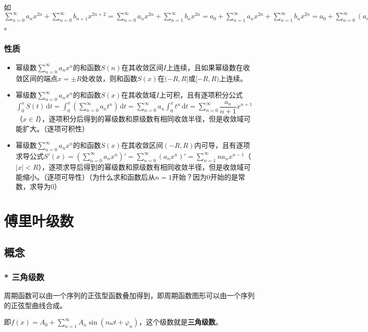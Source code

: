 如$\sum\limits_{n=0}^\infty a_nx^{2n}+\sum\limits_{n=0}^\infty b_{n+1}x^{2n+2}=\sum\limits_{n=0}^\infty a_nx^{2n}+\sum\limits_{n=1}^\infty b_nx^{2n}=a_0+\sum\limits_{n=1}^\infty a_nx^{2n}+\sum\limits_{n=1}^\infty b_nx^{2n}=a_0+\sum\limits_{n=0}^\infty(a_n+b_n)x^{2n}$。

\subsubsection{性质}

\begin{itemize}
    \item 幂级数$\sum\limits_{n=0}^\infty a_nx^n$的和函数$S(n)$在其收敛区间$I$上连续，且如果幂级数在收敛区间的端点$x=\pm R$处收敛，则和函数$S(x)$在$(-R,R]$或$[-R,R)$上连续。
    \item 幂级数$\sum\limits_{n=0}^\infty a_nx^n$的和函数$S(x)$在其收敛域$I$上可积，且有逐项积分公式$\int_0^xS(t)\,\textrm{d}t=\int_0^x(\sum\limits_{n=0}^\infty a_nt^n)\,\textrm{d}t=\sum\limits_{n=0}^\infty a_n\int_0^xt^n\,\textrm{d}t=\sum\limits_{n=0}^\infty\dfrac{a_n}{n+1}x^{n+1}$（$x\in I$），逐项积分后得到的幂级数和原级数有相同收敛半径，但是收敛域可能扩大。（逐项可积性）
    \item 幂级数$\sum\limits_{n=0}^\infty a_nx^n$的和函数$S(x)$在其收敛区间$(-R,R)$内可导，且有逐项求导公式$S'(x)=(\sum\limits_{n=0}^\infty a_nx^n)'=\sum\limits_{n=0}^\infty(a_nx^n)'=\sum\limits_{n=1}^\infty na_nx^{n-1}$（$\vert x\vert<R$），逐项求导后得到的幂级数和原级数有相同收敛半径，但是收敛域可能缩小。（逐项可导性）（为什么求和函数后从$n=1$开始？因为0开始的是常数，求导为0）
\end{itemize}

\section{傅里叶级数}

\subsection{概念}

\subsubsection{* 三角级数}

周期函数可以由一个序列的正弦型函数叠加得到，即周期函数图形可以由一个序列的正弦型曲线合成。

即$f(x)=A_0+\sum\limits_{n=1}^\infty A_n\sin(n\omega t+\varphi_n)$，这个级数就是\textbf{三角级数}。


